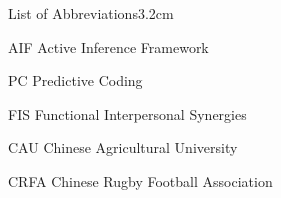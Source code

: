 \begin{mclistof}{List of Abbreviations}{3.2cm}

  \item[AIF] Active Inference Framework
  \item[PC] Predictive Coding
  \item[FIS] Functional Interpersonal Synergies
  \item[CAU] Chinese Agricultural University
  \item[CRFA] Chinese Rugby Football Association

\end{mclistof}
